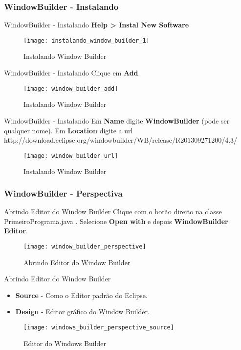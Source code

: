 \documentclass[10pt]{beamer}
\begin{document}
\subsubsection{WindowBuilder - Instalando }
\begin{frame}{WindowBuilder - Instalando }
\textbf{Help > Instal New Software}
  \begin{figure}[!htb]
    \centering
    \texttt{[image: instalando\_window\_builder\_1]}
    \caption{Instalando Window Builder}
    \label{figRotulo}
  \end{figure}
\end{frame}{}

\begin{frame}{WindowBuilder - Instalando }
Clique em \textbf{Add}.
  \begin{figure}[!htb]
    \centering
    \texttt{[image: window\_builder\_add]}
    \caption{Instalando Window Builder}
    \label{figRotulo}
  \end{figure}
\end{frame}{}

\begin{frame}{WindowBuilder - Instalando }
Em \textbf{Name} digite \textbf{WindowBuilder} (pode ser qualquer nome).
\linebreak
Em \textbf{Location} digite a url 
	http://download.eclipse.org/windowbuilder/WB/release/R201309271200/4.3/
  \begin{figure}[!htb]
    \centering
    \texttt{[image: window\_builder\_url]}
    \caption{Instalando Window Builder}
    \label{figRotulo}
  \end{figure}
\end{frame}{}

\subsubsection{WindowBuilder - Perspectiva }
\begin{frame}{Abrindo Editor do Window Builder}
Clique com o botão direito na classe PrimeiroPrograma.java . Selecione \textbf{Open with} e depois \textbf{WindowBuilder Editor}.
  \begin{figure}[!htb]
    \centering
    \texttt{[image: window\_builder\_perspective]}
    \caption{Abrindo Editor do Window Builder}
    \label{figRotulo}
  \end{figure}
\end{frame}{}

\begin{frame}{Abrindo Editor do Window Builder}
\begin{itemize}
\item \textbf{Source} - Como o Editor padrão do Eclipse.
\item \textbf{Design} - Editor gráfico do Window Builder.
\end{itemize}
  \begin{figure}[!htb]
    \centering
    \texttt{[image: windows\_builder\_perspective\_source]}
    \caption{Editor do Windows Builder}
    \label{figRotulo}
  \end{figure}
\end{frame}{}
\end{document}
